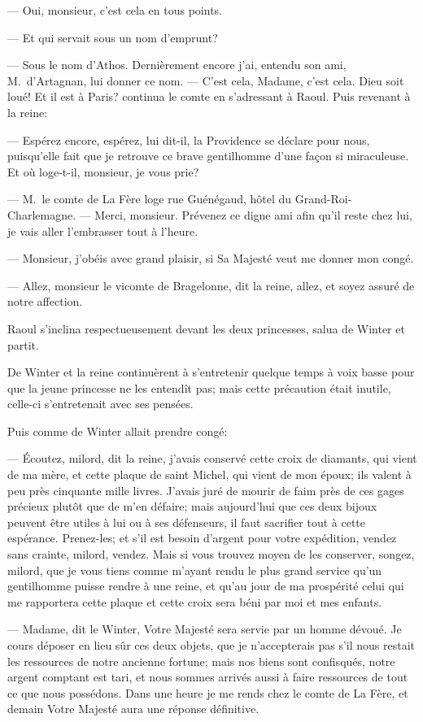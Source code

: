 — Oui, monsieur, c'est cela en tous points.

— Et qui servait sous un nom d'emprunt?

— Sous le nom d'Athos. Dernièrement encore j'ai, entendu son ami, M.~d'Artagnan, lui donner ce nom.
— C'est cela, Madame, c'est cela. Dieu soit loué! Et il est à Paris? continua le comte en s'adressant à Raoul.
Puis revenant à la reine:

— Espérez encore, espérez, lui dit-il, la Providence se déclare pour nous, puisqu'elle fait que je retrouve ce brave gentilhomme d'une façon si miraculeuse. Et où loge-t-il, monsieur, je vous prie?

— M.~le comte de La Fère loge rue Guénégaud, hôtel du Grand-Roi-Charlemagne.
— Merci, monsieur. Prévenez ce digne ami afin qu'il reste chez lui, je vais aller l'embrasser tout à l'heure.

— Monsieur, j'obéis avec grand plaisir, si Sa Majesté veut me donner mon congé.

— Allez, monsieur le vicomte de Bragelonne, dit la reine, allez, et soyez assuré de notre affection.

Raoul s'inclina respectueusement devant les deux princesses, salua de Winter et partit.

De Winter et la reine continuèrent à s'entretenir quelque temps à voix basse pour que la jeune princesse ne les entendît pas; mais cette précaution était inutile, celle-ci s'entretenait avec ses pensées.

Puis comme de Winter allait prendre congé:

— Écoutez, milord, dit la reine, j'avais conservé cette croix de diamants, qui vient de ma mère, et cette plaque de saint Michel, qui vient de mon époux; ils valent à peu près cinquante mille livres. J'avais juré de mourir de faim près de ces gages précieux plutôt que de m'en défaire; mais aujourd'hui que ces deux bijoux peuvent être utiles à lui ou à ses défenseurs, il faut sacrifier tout à cette espérance. Prenez-les; et s'il est besoin d'argent pour votre expédition, vendez sans crainte, milord, vendez. Mais si vous trouvez moyen de les conserver, songez, milord, que je vous tiens comme m'ayant rendu le plus grand service qu'un gentilhomme puisse rendre à une reine, et qu'au jour de ma prospérité celui qui me rapportera cette plaque et cette croix sera béni par moi et mes enfants.

— Madame, dit le Winter, Votre Majesté sera servie par un homme dévoué. Je cours déposer en lieu sûr ces deux objets, que je n'accepterais pas s'il nous restait les ressources de notre ancienne fortune; mais nos biens sont confisqués, notre argent comptant est tari, et nous sommes arrivés aussi à faire ressources de tout ce que nous possédons. Dans une heure je me rends chez le comte de La Fère, et demain Votre Majesté aura une réponse définitive.

